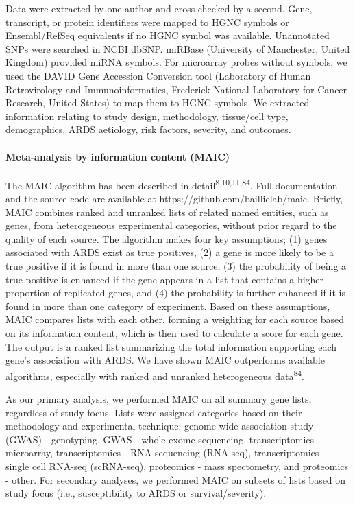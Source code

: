\documentclass[
  11,
  a4paper,
]{article}
\let\oldparagraph\paragraph
\renewcommand{\paragraph}[1]{\oldparagraph{#1}\mbox{}}
\begin{document}
Data were extracted by one author and cross-checked by a second. Gene,
transcript, or protein identifiers were mapped to HGNC symbols or
Ensembl/RefSeq equivalents if no HGNC symbol was available. Unannotated
SNPs were searched in NCBI dbSNP. miRBase (University of Manchester,
United Kingdom) provided miRNA symbols. For microarray probes without
symbols, we used the DAVID Gene Accession Conversion tool (Laboratory of
Human Retrovirology and Immunoinformatics, Frederick National Laboratory
for Cancer Research, United States) to map them to HGNC symbols. We
extracted information relating to study design, methodology, tissue/cell
type, demographics, ARDS aetiology, risk factors, severity, and
outcomes.

\paragraph{Meta-analysis by information content
(MAIC)}\label{meta-analysis-by-information-content-maic-1}

The MAIC algorithm has been described in
detail\textsuperscript{8,10,11,84}. Full documentation and the source
code are available at https://github.com/baillielab/maic. Briefly, MAIC
combines ranked and unranked lists of related named entities, such as
genes, from heterogeneous experimental categories, without prior regard
to the quality of each source. The algorithm makes four key assumptions;
(1) genes associated with ARDS exist as true positives, (2) a gene is
more likely to be a true positive if it is found in more than one
source, (3) the probability of being a true positive is enhanced if the
gene appears in a list that contains a higher proportion of replicated
genes, and (4) the probability is further enhanced if it is found in
more than one category of experiment. Based on these assumptions, MAIC
compares lists with each other, forming a weighting for each source
based on its information content, which is then used to calculate a
score for each gene. The output is a ranked list summarizing the total
information supporting each gene's association with ARDS. We have shown
MAIC outperforms available algorithms, especially with ranked and
unranked heterogeneous data\textsuperscript{84}.

As our primary analysis, we performed MAIC on all summary gene lists,
regardless of study focus. Lists were assigned categories based on their
methodology and experimental technique: genome-wide association study
(GWAS) - genotyping, GWAS - whole exome sequencing, transcriptomics -
microarray, transcriptomics - RNA-sequencing (RNA-seq), transcriptomics
- single cell RNA-seq (scRNA-seq), proteomics - mass spectometry, and
proteomics - other. For secondary analyses, we performed MAIC on subsets
of lists based on study focus (i.e., susceptibility to ARDS or
survival/severity).
\end{document}
